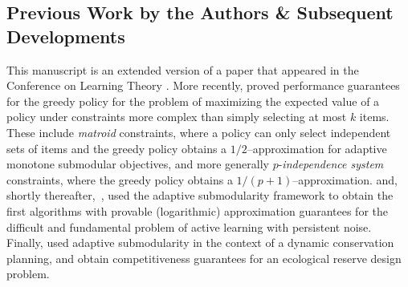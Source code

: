 \subsection{Previous Work by the Authors \& Subsequent Developments}
This manuscript is an extended version of a paper that appeared in the
Conference on Learning Theory \cite{golovin10colt}. 
More recently, \citet{golovin11matroid_arxiv} proved performance
guarantees for the greedy policy for the problem of
maximizing the expected value of a policy under constraints more
complex than simply selecting at most $k$ items.
These include \emph{matroid} constraints, where a policy can only
select independent sets of items and the greedy policy obtains a
$1/2$--approximation for adaptive monotone submodular objectives, and
more generally $p$-\emph{independence system} constraints, where the
greedy policy obtains a $1/(p+1)$--approximation.
\citet{golovin10nips} and, shortly thereafter,~\citet{bellala10modified}, used the adaptive submodularity framework to obtain the first algorithms
with provable (logarithmic) approximation guarantees for the difficult and fundamental problem of 
active learning with persistent noise.
Finally, \citet{golovin11aaai} used adaptive submodularity in the
context of a dynamic conservation planning, and obtain competitiveness guarantees
for an ecological reserve design problem.


%
%
%
%
%
